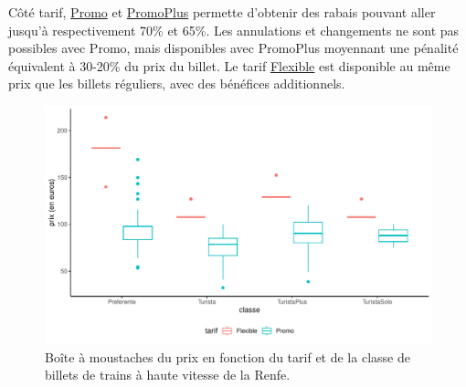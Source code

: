 \documentclass[
  11pt,
  letterpaper,
]{scrbook}
\theoremstyle{definition}
\theoremstyle{remark}
\begin{document}
Côté tarif,
\href{http://web.archive.org/web/20161111134241/http://www.renfe.com/viajeros/tarifas/billete_promo.html}{Promo}
et
\href{http://web.archive.org/web/20161110220249/http://www.renfe.com/viajeros/tarifas/billete_promoplus.html}{PromoPlus}
permette d'obtenir des rabais pouvant aller jusqu'à respectivement 70\%
et 65\%. Les annulations et changements ne sont pas possibles avec
Promo, mais disponibles avec PromoPlus moyennant une pénalité équivalent
à 30-20\% du prix du billet. Le tarif
\href{http://web.archive.org/web/20161108192609/http://www.renfe.com/viajeros/tarifas/billete_flexible.html}{Flexible}
est disponible au même prix que les billets réguliers, avec des
bénéfices additionnels.

\begin{figure}[ht!]

{\centering \includegraphics[width=1\textwidth,height=\textheight]{analyseexploratoire_files/figure-pdf/fig-renfe-aed6-1.pdf}

}

\caption{\label{fig-renfe-aed6}Boîte à moustaches du prix en fonction du
tarif et de la classe de billets de trains à haute vitesse de la Renfe.}

\end{figure}
\end{document}
